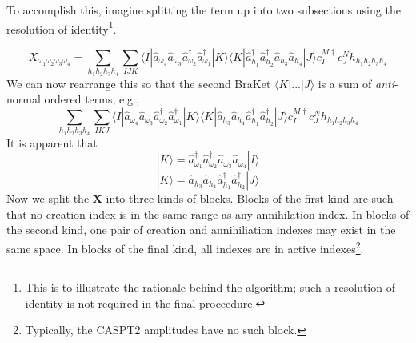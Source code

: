 \documentclass[12pt]{article}
\begin{document}
\noindent To accomplish this, imagine splitting the term up into 
two subsections using the resolution of identity\footnote{This is to illustrate the rationale behind
the algorithm; such a resolution of identity is not required in the final proceedure.}.

\begin{equation}
X_{\omega_{1}\omega_{2}\omega_{3}\omega_{4}}
= 
\sum_{ h_{1}h_{2}h_{3}h_{4}} 
\sum_{IJK}
\langle I |
\hat{a}_{\omega_{4}} \hat{a}_{\omega_{3}}\hat{a}^{\dagger}_{\omega_{2}}\hat{a}^{\dagger}_{\omega_{1}}
| K \rangle \langle K | 
\hat{a}^{\dagger}_{h_{1}} \hat{a}^{\dagger}_{h_{2}}\hat{a}_{h_{3}}\hat{a}_{h_{4}}| J \rangle  
c^{M \dagger}_{I}c^{N}_{J} h_{h_{1}h_{2}h_{3}h_{4}}
\label{eqn:X_RI_H_example}
\end{equation}
\noindent We can now rearrange this so that the second BraKet $\langle K | ... | J \rangle$ is a sum of \emph{anti}-normal ordered terms, e.g.,
\begin{equation}
\sum_{ h_{1}h_{2}h_{3}h_{4}} 
\sum_{IKJ}
\langle I |
\hat{a}_{\omega_{4}} \hat{a}_{\omega_{3}}\hat{a}^{\dagger}_{\omega_{2}}\hat{a}^{\dagger}_{\omega_{1}}
| K \rangle \langle K | 
\hat{a}_{h_{3}}\hat{a}_{h_{4}}\hat{a}^{\dagger}_{h_{1}} \hat{a}^{\dagger}_{h_{2}}| J \rangle  
c^{M \dagger}_{I}c^{N}_{J} h_{h_{1}h_{2}h_{3}h_{4}}
\label{eqn:X_RI_H_anti_normal1}
\end{equation}
It is apparent that 
\begin{equation}
|K\rangle = \hat{a}_{\omega_{1}}^{\dagger} \hat{a}_{\omega_{2}}^{\dagger}\hat{a}_{\omega_{3}}\hat{a}_{\omega_{4}} |I \rangle
\label{eqn:KI}
\end{equation}
\begin{equation}
|K\rangle =\hat{a}_{h_{3}}\hat{a}_{h_{4}}\hat{a}^{\dagger}_{h_{1}} \hat{a}^{\dagger}_{h_{2}}|J \rangle
\label{eqn:KJ}
\end{equation}
\noindent Now we split the $\mathbf{X}$ into three kinds of blocks. Blocks of the first kind are such that no creation index is in the same 
range as any annihilation index. In blocks of the second kind, one pair of creation and annihiliation indexes may exist in the same space.
In blocks of the final kind, all indexes are in active indexes\footnote{Typically, the CASPT2 amplitudes have no such block.}. \\
 
\end{document}
